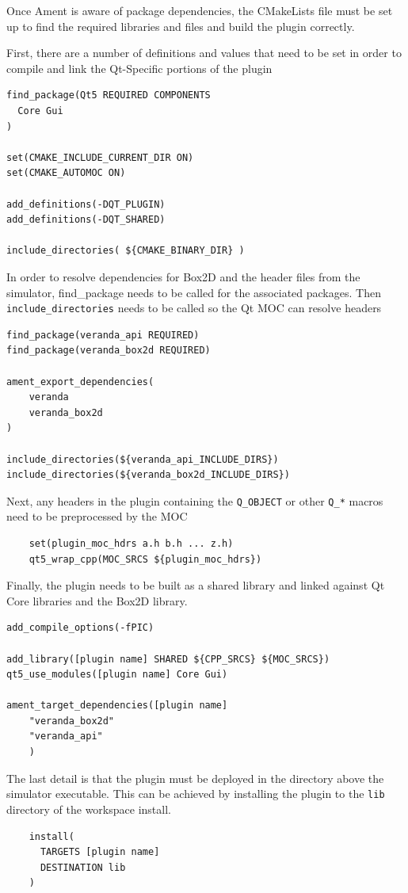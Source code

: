 \begin{itemize}
Once Ament is aware of package dependencies, the CMakeLists file must be set up to find the required libraries and files and build the plugin correctly.

First, there are a number of definitions and values that need to be set in order to compile and link the Qt-Specific portions of the plugin
\begin{lstlisting}
find_package(Qt5 REQUIRED COMPONENTS
  Core Gui
)

set(CMAKE_INCLUDE_CURRENT_DIR ON)
set(CMAKE_AUTOMOC ON)

add_definitions(-DQT_PLUGIN)
add_definitions(-DQT_SHARED)

include_directories( ${CMAKE_BINARY_DIR} )
\end{lstlisting}

In order to resolve dependencies for Box2D and the header files from the simulator, find\_package needs to be called for the associated packages. Then \lstinline|include_directories| needs to be called so the Qt MOC can resolve headers
\begin{lstlisting}
find_package(veranda_api REQUIRED)
find_package(veranda_box2d REQUIRED)
    
ament_export_dependencies(
    veranda
    veranda_box2d
)

include_directories(${veranda_api_INCLUDE_DIRS})
include_directories(${veranda_box2d_INCLUDE_DIRS})
\end{lstlisting}

Next, any headers in the plugin containing the \lstinline|Q_OBJECT| or other \lstinline|Q_*| macros need to be preprocessed by the MOC
\begin{lstlisting}
	set(plugin_moc_hdrs a.h b.h ... z.h)
    qt5_wrap_cpp(MOC_SRCS ${plugin_moc_hdrs})
\end{lstlisting}

Finally, the plugin needs to be built as a shared library and linked against Qt Core libraries and the Box2D library.
\begin{lstlisting}
add_compile_options(-fPIC)

add_library([plugin name] SHARED ${CPP_SRCS} ${MOC_SRCS})
qt5_use_modules([plugin name] Core Gui)

ament_target_dependencies([plugin name]
	"veranda_box2d"
	"veranda_api"
	)
\end{lstlisting}

The last detail is that the plugin must be deployed in the directory above the simulator executable. This can be achieved by installing the plugin to the \lstinline|lib| directory of the workspace install.
\begin{lstlisting}
    install(
      TARGETS [plugin name]
      DESTINATION lib
    )
\end{lstlisting}


\end{itemize}
